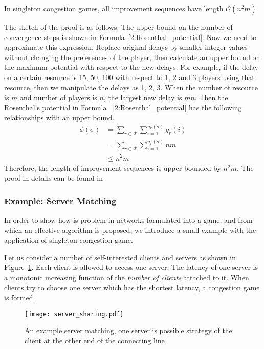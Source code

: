 \begin{theorem}
\label{background:polynomialConvergence}
In singleton congestion games, all improvement sequences have length $\mathcal{O}(n^2m)$~\cite{aaai_IeongMNSS05}
\end{theorem}

The sketch of the proof is as follows.
The upper bound on the number of convergence steps is shown in Formula~\ref{2:Rosenthal_potential}.
Now we need to approximate this expression.
Replace original delays by smaller integer values without changing the preferences of the player, then calculate an upper bound on the maximum potential with respect to the new delays.
For example, if the delay on a certain resource is 15, 50, 100 with respect to 1, 2 and 3 players using that resource, then we manipulate the delays as 1, 2, 3.
When the number of resource is $m$ and number of players is $n$, the largest new delay is $mn$.
Then the Rosenthal's potential in Formula ~\ref{2:Rosenthal_potential} has the following relationships with an upper bound.
\begin{equation}
\label{2:Rosenthal_potential_newdelay}
\begin{split}
\phi(\sigma) 
& =\sum\limits^{}_{r\in \mathcal{R}} \sum\limits^{n_r(\sigma)}_{i=1} g_r(i)\\
& =\sum\limits^{}_{r\in \mathcal{R}} \sum\limits^{n_r(\sigma)}_{i=1} nm\\
& \leq n^2m
\end{split}
\end{equation}
Therefore, the length of improvement sequences is upper-bounded by $n^2m$.
The proof in details can be found in ~\cite{aaai_IeongMNSS05, LectureA}


\subsubsection*{Example: Server Matching}
In order to show how is problem in networks formulated into a game, and from which an effective algorithm is proposed, we introduce a small example with the application of singleton congestion game.

Let us consider a number of self-interested clients and servers as shown in Figure~\ref{server_sharing}.
Each client is allowed to access one server.
The latency of one server is a monotonic increasing function of the \textit{number of clients} attached to it.
When clients try to choose one server which has the shortest latency, a congestion game is formed.
\begin{figure}[h!]
  \centering
  \texttt{[image: server\_sharing.pdf]}
  \caption{An example server matching, one server is possible strategy of the client at the other end of the connecting line}
\label{server_sharing}
\end{figure}

